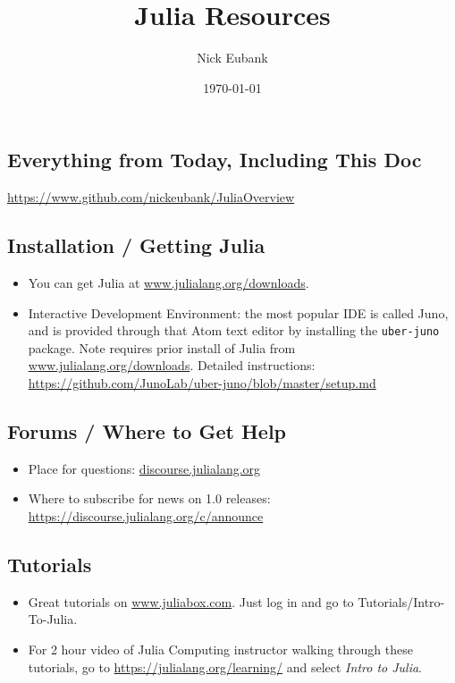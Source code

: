 \documentclass[12pt]{article}
\title{Julia Resources}
\author{Nick Eubank}
\date{\today}
\begin{document}
\maketitle

\subsection*{Everything from Today, Including This Doc}
\url{https://www.github.com/nickeubank/JuliaOverview}




\subsection*{Installation / Getting Julia}
\begin{itemize}
    \item You can get Julia at \url{www.julialang.org/downloads}.
    \item Interactive Development Environment: the most popular IDE is called Juno, and is provided through that Atom text editor by installing the \texttt{uber-juno} package. Note requires prior install of Julia from \url{www.julialang.org/downloads}. Detailed instructions: \url{https://github.com/JunoLab/uber-juno/blob/master/setup.md}
\end{itemize}


\subsection*{Forums / Where to Get Help}
\begin{itemize}
    \item Place for questions: \url{discourse.julialang.org}
    \item Where to subscribe for news on 1.0 releases: \url{https://discourse.julialang.org/c/announce}
\end{itemize}

\subsection*{Tutorials}
\begin{itemize}
    \item Great tutorials on \url{www.juliabox.com}. Just log in and go to Tutorials/Intro-To-Julia.
    \item For 2 hour video of Julia Computing instructor walking through these tutorials, go to \url{https://julialang.org/learning/} and select \emph{Intro to Julia}.
\end{itemize}
\end{document}
